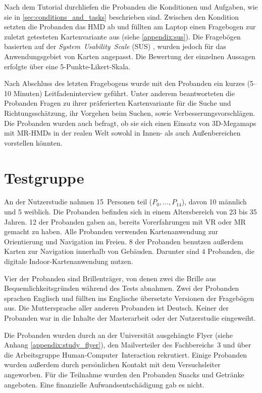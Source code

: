 Nach dem Tutorial durchliefen die Probanden die Konditionen und Aufgaben, wie sie in \autoref{sec:conditions_and_tasks} beschrieben sind.
Zwischen den Kondition setzten die Probanden das HMD ab und füllten am Laptop einen Fragebogen zur zuletzt getesteten Kartenvariante aus (siehe \autoref{appendix:sus}).
Die Fragebögen basierten auf der \emph{System~Usability~Scale} (SUS) \autocite{Brooke2013}, wurden jedoch für das Anwendungsgebiet von Karten angepasst.
Die Bewertung der einzelnen Aussagen erfolgte über eine 5-Punkte-Likert-Skala.

Nach Abschluss des letzten Fragebogens wurde mit den Probanden ein kurzes (5--10 Minuten) Leitfadeninterview geführt.
Unter anderem beantworteten die Probanden Fragen zu ihrer präferierten Kartenvariante für die Suche und Richtungsschätzung, ihr Vorgehen beim Suchen, sowie Verbesserungsvorschlägen.
Die Probanden wurden auch befragt, ob sie sich einen Einsatz von 3D-Megamaps mit MR-HMDs in der realen Welt sowohl in Innen- als auch Außenbereichen vorstellen könnten.

\section{Testgruppe}
An der Nutzerstudie nahmen 15~Personen teil ($P_0, \dots, P_{14}$), davon 10 männlich und 5 weiblich.
Die Probanden befinden sich in einem Altersbereich von 23 bis 35 Jahren.
12 der Probanden gaben an, bereits Vorerfahrungen mit VR oder MR gemacht zu haben.
Alle Probanden verwenden Kartenanwendung zur Orientierung und Navigation im Freien.
8 der Probanden benutzen außerdem Karten zur Navigation innerhalb von Gebäuden.
Darunter sind 4 Probanden, die digitale Indoor-Kartenanwendung nutzen.

Vier der Probanden sind Brillenträger, von denen zwei die Brille aus Bequemlichkeitsgründen während des Tests abnahmen.
Zwei der Probanden sprachen Englisch und füllten ins Englische übersetzte Versionen der Fragebögen aus.
Die Muttersprache aller anderen Probanden ist Deutsch.
Keiner der Probanden war in die Inhalte der Masterarbeit oder der Nutzerstudie eingeweiht.

Die Probanden wurden durch an der Universität ausgehängte Flyer (siehe Anhang \autoref{appendix:study_flyer}), den Mailverteiler des Fachbereichs~3 und über die Arbeitsgruppe Human-Computer~Interaction rekrutiert.
Einige Probanden wurden außerdem durch persönlichen Kontakt mit dem Versuchsleiter angeworben.
Für die Teilnahme wurden den Probanden Snacks und Getränke angeboten.
Eine finanzielle Aufwandsentschädigung gab es nicht.

